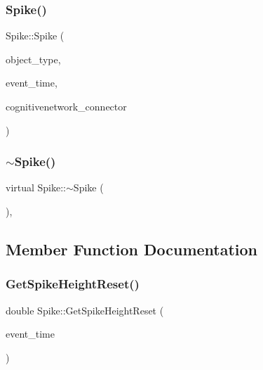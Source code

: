 \mbox{\label{classSpike_afecf811f48103b529016a73349b50fe4}} 
\subsubsection{\texorpdfstring{Spike()}{Spike()}\hspace{0.1cm}{\footnotesize\ttfamily [4/4]}}
{\footnotesize\ttfamily Spike\+::\+Spike (\begin{DoxyParamCaption}\item[{unsigned int}]{object\+\_\+type,  }\item[{std\+::chrono\+::time\+\_\+point$<$ \mbox{\hyperlink{universe_8h_a0ef8d951d1ca5ab3cfaf7ab4c7a6fd80}{Clock}} $>$}]{event\+\_\+time,  }\item[{\mbox{\hyperlink{classCognitiveNetwork}{Cognitive\+Network}} \&}]{cognitivenetwork\+\_\+connector }\end{DoxyParamCaption})\hspace{0.3cm}{\ttfamily [inline]}}

\mbox{\label{classSpike_a6c2c62e81cb32ca4eb73bc686974d00d}} 
\subsubsection{\texorpdfstring{$\sim$\+Spike()}{~Spike()}}
{\footnotesize\ttfamily virtual Spike\+::$\sim$\+Spike (\begin{DoxyParamCaption}{ }\end{DoxyParamCaption})\hspace{0.3cm}{\ttfamily [inline]}, {\ttfamily [virtual]}}



\subsection{Member Function Documentation}
\mbox{\label{classSpike_a6266871881a2581aaee499f6a10e1841}} 
\subsubsection{\texorpdfstring{Get\+Spike\+Height\+Reset()}{GetSpikeHeightReset()}}
{\footnotesize\ttfamily double Spike\+::\+Get\+Spike\+Height\+Reset (\begin{DoxyParamCaption}\item[{std\+::chrono\+::time\+\_\+point$<$ \mbox{\hyperlink{universe_8h_a0ef8d951d1ca5ab3cfaf7ab4c7a6fd80}{Clock}} $>$}]{event\+\_\+time }\end{DoxyParamCaption})\hspace{0.3cm}{\ttfamily [inline]}}

